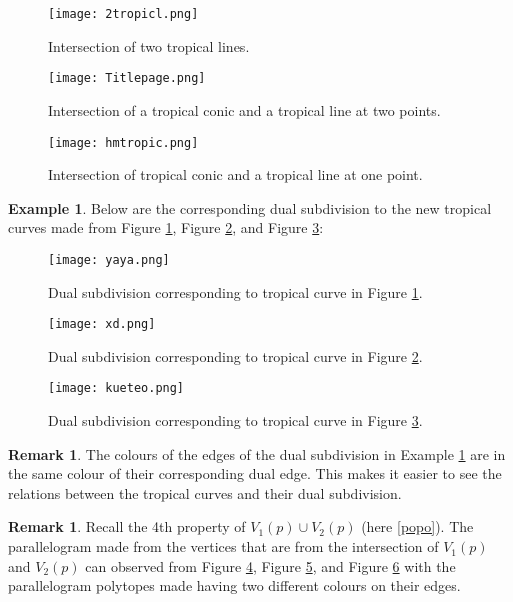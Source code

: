 \documentclass[]{article}
\theoremstyle{definition}
\numberwithin{equation}{section}
\newtheorem{examp}[thm]{Example}
\newtheorem{rmk}[thm]{Remark}
\renewcommand{\.}{\,.}
\begin{document}
\begin{figure}[H]
	\centering
	\texttt{[image: 2tropicl.png]}
	\caption{Intersection of two tropical lines.}
	\label{fig:16} \end{figure}
\begin{figure}[H]
	\centering
	\texttt{[image: Titlepage.png]}
	\caption{Intersection of a tropical conic and a tropical line at two points.}
	\label{fig:17} \end{figure}
\begin{figure}[H]
	\centering
	\texttt{[image: hmtropic.png]}
	\caption{Intersection of tropical conic and a tropical line at one point.}
	\label{fig:18} \end{figure}
\begin{examp}\label{5.8}
	Below are the corresponding dual subdivision to the new tropical curves made from Figure \ref{fig:16}, Figure \ref{fig:17}, and Figure \ref{fig:18}: 
	\begin{figure}[H]
		\centering
		\texttt{[image: yaya.png]}
		\caption{Dual subdivision corresponding to tropical curve in Figure \ref{fig:16}.}
		\label{fig:19} \end{figure}
	\begin{figure}[H]
		\centering
		\texttt{[image: xd.png]}
		\caption{Dual subdivision corresponding to tropical curve in Figure \ref{fig:17}.}
		\label{fig:20} \end{figure}
	\begin{figure}[H]
		\centering
		\texttt{[image: kueteo.png]}
		\caption{Dual subdivision corresponding to tropical curve in Figure \ref{fig:18}.}
		\label{fig:21} \end{figure}
\end{examp}
\begin{rmk} The colours of the edges of the dual subdivision in Example \ref{5.8} are in the same colour of their corresponding dual edge. This makes it easier to see the relations between the tropical curves and their dual subdivision.
	\end{rmk}
 \begin{rmk}Recall the 4th property of $V_1(p)\cup V_2(p)$ (here \ref{popo}). The parallelogram made from the vertices that are from the intersection of $V_1(p)$ and $V_2(p)$  can observed from Figure \ref{fig:19}, Figure \ref{fig:20}, and Figure \ref{fig:21} with the parallelogram polytopes made having two different colours on their edges. \end{rmk}
\end{document}
